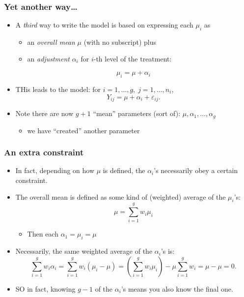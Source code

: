 \documentclass[a4paper]{article}\usepackage[]{graphicx}\usepackage[]{xcolor}
\begin{document}
\subsubsection{Yet another way\dots}
\begin{itemize}
	\item A \textit{third} way to write the model is based on expressing each \( \mu_i \) as
	\begin{itemize}
		\item an \textit{overall mean} \( \mu \) (with no subscript) plus
		\item an \textit{adjustment} \( \alpha_i \) for \( i \)-th level of the treatment:
	\end{itemize}
	\[
		\mu_i = \mu + \alpha_i
	\]
	\item THis leads to the model: for \( i = 1,\dotsc,g,\;j = 1,\dotsc,n_i \),
	\[
		Y_{ij} = \mu + \alpha_i + \varepsilon_{ij}.
	\]
	\item Note there are now \( g+1 \) ``mean'' parameters (sort of): \( \mu,\alpha_1,\dotsc,\alpha_g \)
	\begin{itemize}
		\item we have ``created'' another parameter
	\end{itemize}
\end{itemize}
\subsubsection{An extra constraint}
\begin{itemize}
	\item In fact, depending on how \( \mu \) is defined, the \( \alpha_i \)'s necessarily obey a certain constraint.
	\item The overall mean is defined as some kind of (weighted) average of the \( \mu_i \)'s:
	\[
		\mu = \sum_{i=1}^{g} w_i \mu_i
	\]
	\begin{itemize}
		\item Then each \( \alpha_1 = \mu_i = \mu \) 
	\end{itemize}
	\item Necessarily, the same weighted average of the \( \alpha_i \)'s is:
	\[
		\sum_{i=1}^gw_i\alpha_i= \sum_{i=1}^gw_i(\mu_i-\mu)= \left(\sum_{i=1}^gw_i\mu_i\right)-\mu\sum_{i=1}^gw_i=\mu-\mu=0.
	\]
	\item SO in fact, knowing \( g-1 \) of the \( \alpha_i \)'s means you also know the final one.
\end{itemize}
\end{document}
